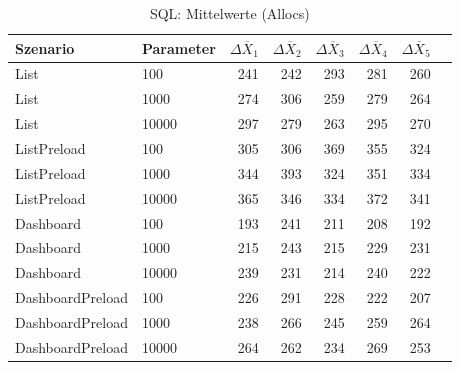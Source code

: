 
\begin{table}[ht]
\setlength{\extrarowheight}{-1pt}
\centering
\caption{SQL: Mittelwerte (Allocs)}
\begin{tabular}{llrrrrrr}
\toprule
Szenario & Parameter & ${\Delta \overline{X}_1}$ & ${\Delta \overline{X}_2}$ & ${\Delta \overline{X}_3}$ & ${\Delta \overline{X}_4}$ & ${\Delta \overline{X}_5}$ \\
\midrule
	List & 100 & 241 & 242 & 293 & 281 & 260 \\
	List & 1000 & 274 & 306 & 259 & 279 & 264 \\
	List & 10000 & 297 & 279 & 263 & 295 & 270 \\
	ListPreload & 100 & 305 & 306 & 369 & 355 & 324 \\
	ListPreload & 1000 & 344 & 393 & 324 & 351 & 334 \\
	ListPreload & 10000 & 365 & 346 & 334 & 372 & 341 \\
	Dashboard & 100 & 193 & 241 & 211 & 208 & 192 \\
	Dashboard & 1000 & 215 & 243 & 215 & 229 & 231 \\
	Dashboard & 10000 & 239 & 231 & 214 & 240 & 222 \\
	DashboardPreload & 100 & 226 & 291 & 228 & 222 & 207 \\
	DashboardPreload & 1000 & 238 & 266 & 245 & 259 & 264 \\
	DashboardPreload & 10000 & 264 & 262 & 234 & 269 & 253 \\
\bottomrule
\end{tabular}
\label{tab:mittelwerte_sql_allocs}
\end{table}
	